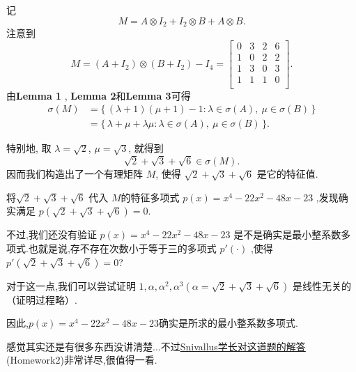 \begin{problem}[选做]
\begin{solution}
    记
    \[
        M=A \otimes I_2 + I_2 \otimes B + A \otimes B.
    \]
    注意到
    \[
        M=(A+I_2)\otimes(B+I_2)-I_4=
            \begin{bmatrix}
                0&3&2&6\\
                1&0&2&2\\
                1&3&0&3\\
                1&1&1&0\\
            \end{bmatrix}.
    \]
    由\textbf{Lemma 1} , \textbf{Lemma 2}和\textbf{Lemma 3}可得
    \begin{align*}
        \sigma(M)
        &=\{\,(\lambda+1)(\mu+1)-1:\lambda\in\sigma(A),\ \mu\in\sigma(B)\,\} \\
        &=\{\,\lambda + \mu + \lambda \mu:\lambda\in\sigma(A),\ \mu\in\sigma(B)\,\}.
    \end{align*}
        
    特别地, 取 $\lambda=\sqrt2$, $\mu=\sqrt3$, 就得到
    \[
        \sqrt2+\sqrt3+\sqrt6\in\sigma(M).
    \]
    因而我们构造出了一个有理矩阵 $M$, 使得 $\sqrt2+\sqrt3+\sqrt6$ 是它的特征值.

    将$\sqrt2+\sqrt3+\sqrt6$ 代入 $M$的特征多项式 $p(x) = x^4 - 22x^2 - 48x - 23$ ,发现确实满足 $p(\sqrt2+\sqrt3+\sqrt6)=0$. 

    不过,我们还没有验证 $p(x) = x^4 - 22x^2 - 48x - 23$ 是不是确实是最小整系数多项式.也就是说,存不存在次数小于等于三的多项式 $p'(\cdot )$ ,使得 $p'(\sqrt2+\sqrt3+\sqrt6) = 0$?
    
    对于这一点,我们可以尝试证明 $1,\alpha,\alpha^2,\alpha^3(\alpha = \sqrt2+\sqrt3+\sqrt6)$ 是线性无关的（证明过程略）.

    因此,$p(x) = x^4 - 22x^2 - 48x - 23$确实是所求的最小整系数多项式.

    \begin{solnote}
        感觉其实还是有很多东西没讲清楚...不过\href{https://github.com/Snivallus/FDU-Course-Notes-2024-2025}{Snivallus学长对这道题的解答}\textrm{(Homework2)}非常详尽,很值得一看.
    \end{solnote}

\end{solution}
\end{problem}
